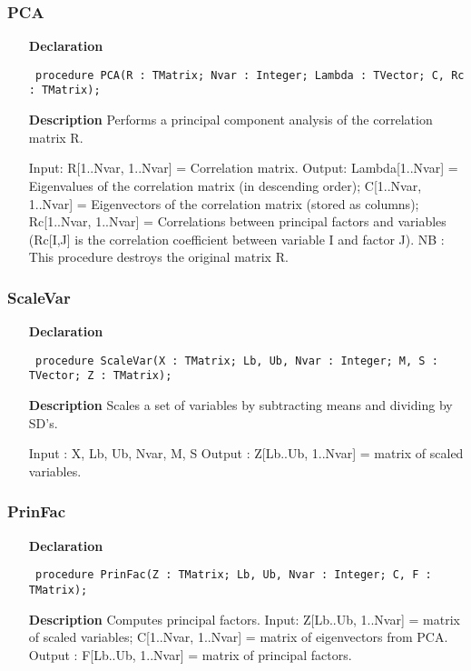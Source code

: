 \documentclass[12pt,a4paper,oneside]{report}
\newcommand{\declarationitem}[1]{\textbf{#1}}
\newcommand{\descriptiontitle}[1]{\textbf{#1}}
\newcommand{\code}[1]{\texttt{#1}}
\begin{document}
\subsubsection{PCA}
\label{upca-PCA}
\begin{itemize}\item[\declarationitem{Declaration}\hfill]
	\begin{flushleft}
		\code{
			procedure PCA(R : TMatrix; Nvar : Integer; Lambda : TVector; C, Rc : TMatrix);}
	\end{flushleft}
	\item[\descriptiontitle{Description}]
	Performs a principal component analysis of the correlation matrix R.
	
	Input: R[1..Nvar, 1..Nvar] = Correlation matrix. Output: Lambda[1..Nvar] = Eigenvalues of the correlation matrix (in descending order); C[1..Nvar, 1..Nvar] = Eigenvectors of the correlation matrix (stored as columns); Rc[1..Nvar, 1..Nvar] = Correlations between principal factors and variables (Rc[I,J] is the correlation coefficient between variable I and factor J). NB : This procedure destroys the original matrix R.
	
\end{itemize}
\subsubsection{ScaleVar}
\label{upca-ScaleVar}
\begin{itemize}\item[\declarationitem{Declaration}\hfill]
	\begin{flushleft}
		\code{
			procedure ScaleVar(X : TMatrix; Lb, Ub, Nvar : Integer; M, S : TVector; Z : TMatrix);}
	\end{flushleft}
	\item[\descriptiontitle{Description}]
	Scales a set of variables by subtracting means and dividing by SD's.
	
	Input : X, Lb, Ub, Nvar, M, S Output : Z[Lb..Ub, 1..Nvar] = matrix of scaled variables.
	
\end{itemize}
\subsubsection{PrinFac}
\label{upca-PrinFac}
\begin{itemize}\item[\declarationitem{Declaration}\hfill]
	\begin{flushleft}
		\code{
			procedure PrinFac(Z : TMatrix; Lb, Ub, Nvar : Integer; C, F : TMatrix);}
	\end{flushleft}
	\item[\descriptiontitle{Description}]
	Computes principal factors. Input: Z[Lb..Ub, 1..Nvar] = matrix of scaled variables; C[1..Nvar, 1..Nvar] = matrix of eigenvectors from PCA. Output : F[Lb..Ub, 1..Nvar] = matrix of principal factors.
\end{itemize}
\end{document}

